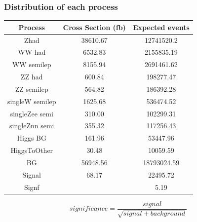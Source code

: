 \documentclass{beamer}
\begin{document}
\begin{frame}
    \frametitle{Distribution of each process}

    \begin{center}
        \footnotesize{
            \begin{tabular}{|c|c|c|}
                \hline
                {Process}&{Cross Section (fb) }&{Expected events}\\\hline
                Zhad&38610.67&12741520.2\\\hline
                WW had&6532.83&2155835.19\\\hline
                WW semilep&8155.94&2691461.62\\\hline
                ZZ had&600.84&198277.47\\\hline
                ZZ semilep&564.82&186392.28\\\hline
                singleW semilep&1625.68&536474.52\\\hline
                singleZee semi&310.00&102299.31\\\hline
                singleZnn semi&355.32&117256.43\\\hline
                Higgs BG&161.96&53447.96\\\hline
                HiggsToOther&30.48&10059.59\\\hline
                \hline
                BG&56948.56&18793024.59\\\hline
                Signal&68.17&22495.72\\\hline
                Signf&&5.19\\\hline
            \end{tabular}
        }   
        \[significance = \frac{signal}{\sqrt{signal + background}}\]
    \end{center}
\end{frame}
\end{document}
